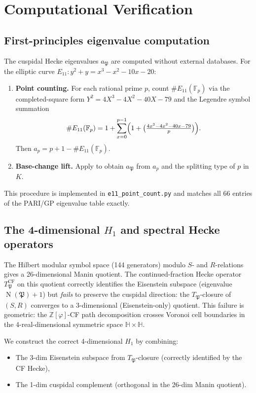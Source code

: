 \documentclass[11pt,a4paper]{article}
\theoremstyle{plain}
\theoremstyle{definition}
\theoremstyle{remark}
\numberwithin{equation}{section}
\providecommand{\HH}{\mathbb{H}}
\providecommand{\ZZ}{\mathbb{Z}}
\providecommand{\FF}{\mathbb{F}}
\providecommand{\fP}{\mathfrak{P}}
\DeclareMathOperator{\Nm}{N}
\begin{document}
\section{Computational Verification}\label{sec:verification}

\subsection{First-principles eigenvalue computation}

The cuspidal Hecke eigenvalues $a_\fP$ are computed without external
databases.  For the elliptic curve $E_{11}: y^2 + y = x^3 - x^2 - 10x - 20$:

\begin{enumerate}
\item \textbf{Point counting.} For each rational prime $p$, count
  $\#E_{11}(\FF_p)$ via the completed-square form $Y^2 = 4X^3 - 4X^2 - 40X - 79$
  and the Legendre symbol summation
  \[
    \#E_{11}(\FF_p) = 1 + \sum_{x=0}^{p-1}\Bigl(1 + \bigl(\tfrac{4x^3 - 4x^2 - 40x - 79}{p}\bigr)\Bigr).
  \]
  Then $a_p = p + 1 - \#E_{11}(\FF_p)$.
\item \textbf{Base-change lift.} Apply  to obtain
  $a_\fP$ from $a_p$ and the splitting type of $p$ in~$K$.
\end{enumerate}

This procedure is implemented in \texttt{e11\_point\_count.py} and matches
all 66 entries of the PARI/GP eigenvalue table exactly.

\subsection{The 4-dimensional \texorpdfstring{$H_1$}{H1} and spectral Hecke operators}

The Hilbert modular symbol space (144 generators) modulo $S$- and $R$-relations
gives a 26-dimensional Manin quotient.  The continued-fraction Hecke operator
$T_\fP^{\mathrm{CF}}$ on this quotient correctly identifies the Eisenstein
subspace (eigenvalue $\Nm(\fP)+1$) but \emph{fails} to preserve the cuspidal
direction: the $T_\fP$-closure of $(S,R)$ converges to a 3-dimensional
(Eisenstein-only) quotient.  This failure is geometric: the $\ZZ[\varphi]$-CF
path decomposition crosses Voronoi cell boundaries in the 4-real-dimensional
symmetric space $\HH \times \HH$.

We construct the correct 4-dimensional $H_1$ by combining:
\begin{itemize}
\item The 3-dim Eisenstein subspace from $T_\fP$-closure (correctly identified by
  the CF Hecke),
\item The 1-dim cuspidal complement (orthogonal in the 26-dim Manin quotient).
\end{itemize}
\end{document}
